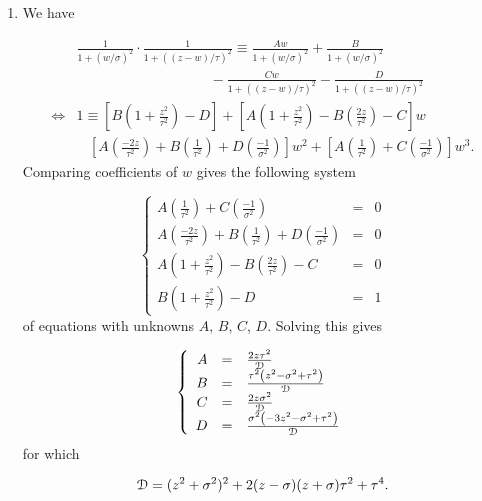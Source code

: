 \documentclass[12pt,letterpaper,reqno]{amsart}
\numberwithin{equation}{subsection}
\begin{document}
\begin{enumerate}[label=(\alph*),leftmargin=*]
    \item We have
    
    \begin{align*}
        &\frac{1}{1+(w/\sigma)^2} \cdot \frac{1}{1+((z-w)/\tau)^2} \equiv \frac{Aw}{1+(w/\sigma)^2} + \frac{B}{1+(w/\sigma)^2} \\
        & \ \ \ \ \ \ \ \ \ \ \ \ \ \ \ \ \ \ \ \ \ \ \ \ \ \ \ \ \ \ \ \ \ \ \ \ \ \ \ \ \ \ \  - \frac{Cw}{1+((z-w)/\tau)^2} -  \frac{D}{1+((z-w)/\tau)^2} \\
        \iff & 1 \equiv \left[  B \left( 1 + \frac{z^2}{\tau^2} \right) - D \right] + \left[ A \left(1 + \frac{z^2}{\tau^2} \right) - B \left( \frac{2z}{\tau^2} \right) -C \right] w \\
        & \ \ \ \ \left[ A \left(\frac{-2z}{\tau^2} \right) + B \left( \frac{1}{\tau^2} \right) + D \left( \frac{-1}{\sigma^2} \right) \right] w^2 + \left[ A \left(\frac{1}{\tau^2}\right) + C \left( \frac{-1}{\sigma^2} \right) \right] w^3.
    \end{align*}
    Comparing coefficients of $w$ gives the following system
    
    \[ \left\{ \begin{array}{rcl}
         A \left(\frac{1}{\tau^2}\right) + C \left( \frac{-1}{\sigma^2} \right) &= & 0  \\
         A \left(\frac{-2z}{\tau^2} \right) + B \left( \frac{1}{\tau^2} \right) + D \left( \frac{-1}{\sigma^2} \right) &= & 0 \\
         A \left(1 + \frac{z^2}{\tau^2} \right) - B \left( \frac{2z}{\tau^2} \right) -C &= & 0 \\
         B \left( 1 + \frac{z^2}{\tau^2} \right) - D &= & 1
    \end{array} \right. \]
    of equations with unknowns $A$, $B$, $C$, $D$. Solving this gives
    
    \[ \left\{ \begin{array}{rcl}
         A &= & \frac{2z \tau^2}{\mathcal{{D}}} \\
         B &= & \frac{\tau^2 \left( z^2 - \sigma^2 + \tau^2 \right)}{\mathcal{{D}}} \\
         C &= & \frac{2z \sigma^2}{\mathcal{{D}}} \\
         D &= & \frac{\sigma^2 \left( -3z^2 - \sigma^2 + \tau^2 \right)}{\mathcal{{D}}}
    \end{array} \right. \]
    for which
    
    \[ \mathcal{{D}} = (z^2 + \sigma^2)^2 + 2(z-\sigma)(z+\sigma)\tau^2 + \tau^4. \]
\end{enumerate}
\end{document}
